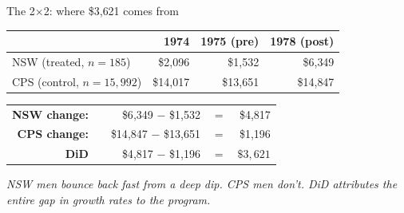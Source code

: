 \documentclass[11pt,aspectratio=169]{beamer}
\begin{document}
\begin{frame}{The 2$\times$2: where \$3{,}621 comes from}
\vspace{0.5em}
\begin{center}
\small
\renewcommand{\arraystretch}{1.5}
\begin{tabular}{@{}lrrr@{}}
\toprule
        & \textbf{1974}    & \textbf{1975 (pre)}    & \textbf{1978 (post)}    \\
\midrule
NSW (treated, $n=185$)   & \$2{,}096   & \cellcolor{accent!25}\$1{,}532    & \cellcolor{accent!25}\$6{,}349 \\
CPS (control, $n=15{,}992$) & \$14{,}017 & \cellcolor{ocean!25}\$13{,}651 & \cellcolor{ocean!25}\$14{,}847 \\
\bottomrule
\end{tabular}
\end{center}

\vspace{0.6em}
\begin{center}
\small
\begin{tabular}{@{}r@{\,\,}c@{\,\,}r@{\,\,}c@{\,\,}r@{}}
\textcolor{accent}{\textbf{NSW change:}}   & & \textcolor{accent}{\$6{,}349 $-$ \$1{,}532}       & $=$ & \textcolor{accent}{\$4{,}817} \\
\textcolor{ocean}{\textbf{CPS change:}}    & & \textcolor{ocean}{\$14{,}847 $-$ \$13{,}651}      & $=$ & \textcolor{ocean}{\$1{,}196} \\
\midrule
\textbf{DiD}                                & & \textcolor{accent}{\$4{,}817} $-$ \textcolor{ocean}{\$1{,}196} & $=$ & $\boxed{\$3{,}621}$ \\
\end{tabular}
\end{center}

\vspace{0.6em}
\begin{center}
\Large
{}
\end{center}
\vspace{0.2em}
\begin{center}
\small\color{warmgray}\itshape
NSW men bounce back fast from a deep dip. \;CPS men don't. \;DiD attributes the entire gap in growth rates to the program.
\end{center}
\end{frame}
\end{document}
